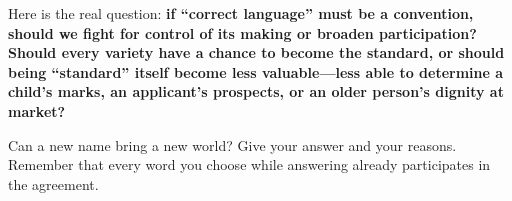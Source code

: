 Here is the real question: \textbf{if ``correct language'' must be a convention, should we fight for control of its making or broaden participation? Should every variety have a chance to become the standard, or should being ``standard'' itself become less valuable---less able to determine a child's marks, an applicant's prospects, or an older person's dignity at market?}

Can a new name bring a new world? Give your answer and your reasons. Remember that every word you choose while answering already participates in the agreement.
